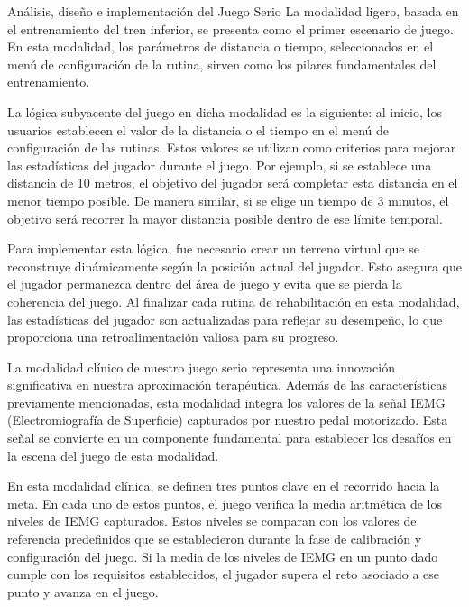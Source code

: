 \begin{thesischapter}{2} {Análisis, diseño e implementación del Juego Serio}
    La modalidad ligero, basada en el entrenamiento del tren inferior, se presenta como el primer escenario de juego. En esta 
    modalidad, los parámetros de distancia o tiempo, seleccionados en el menú de configuración de la rutina, sirven como los pilares 
    fundamentales del entrenamiento.

    \vspace{10pt}
    La lógica subyacente del juego en dicha modalidad es la siguiente: al inicio, los usuarios establecen el valor de la distancia o el tiempo en el menú de configuración de las rutinas. Estos valores se utilizan como criterios para mejorar las estadísticas del jugador durante el juego. Por ejemplo, si se establece una distancia de 10 metros, el objetivo del jugador será completar esta distancia en el menor tiempo posible. De manera similar, si se elige un tiempo de 3 minutos, el objetivo será recorrer la mayor distancia posible dentro de ese límite temporal.

    \vspace{10pt}
    Para implementar esta lógica, fue necesario crear un terreno virtual que se reconstruye dinámicamente según la posición actual del jugador. Esto asegura que el jugador permanezca dentro del área de juego y evita que se pierda la coherencia del juego. Al finalizar cada rutina de rehabilitación en esta modalidad, las estadísticas del jugador son actualizadas para reflejar su desempeño, lo que proporciona una retroalimentación valiosa para su progreso.

    La modalidad clínico de nuestro juego serio representa una innovación significativa en nuestra aproximación terapéutica. Además de las características previamente mencionadas, esta modalidad integra los valores de la señal IEMG (Electromiografía de Superficie) capturados por nuestro pedal motorizado. Esta señal se convierte en un componente fundamental para establecer los desafíos en la escena del juego de esta modalidad.

    \vspace{10pt}
    En esta modalidad clínica, se definen tres puntos clave en el recorrido hacia la meta. En cada uno de estos puntos, el juego verifica la media aritmética de los niveles de IEMG capturados. Estos niveles se comparan con los valores de referencia predefinidos que se establecieron durante la fase de calibración y configuración del juego. Si la media de los niveles de IEMG en un punto dado cumple con los requisitos establecidos, el jugador supera el reto asociado a ese punto y avanza en el juego.



\end{thesischapter}
